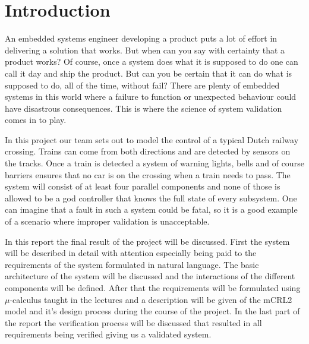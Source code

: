 \documentclass[final]{report}
\begin{document}
\chapter{Introduction}
An embedded systems engineer developing a product puts a lot of effort in delivering a solution that works.
But when can you say with certainty that a product works? Of course, once a system does what it is supposed to do one can call it day and ship the product.
But can you be certain that it can do what is supposed to do, all of the time, without fail? There are plenty of embedded systems in this world where a failure to function or unexpected behaviour could have disastrous consequences.
This is where the science of system validation comes in to play.

In this project our team sets out to model the control of a typical Dutch railway crossing.
Trains can come from both directions and are detected by sensors on the tracks.
Once a train is detected a system of warning lights, bells and of course barriers ensures that no car is on the crossing when a train needs to pass.
The system will consist of at least four parallel components and none of those is allowed to be a god controller that knows the full state of every subsystem.
One can imagine that a fault in such a system could be fatal, so it is a good example of a scenario where improper validation is unacceptable.

In this report the final result of the project will be discussed.
First the system will be described in detail with attention especially being paid to the requirements of the system formulated in natural language.
The basic architecture of the system will be discussed and the interactions of the different components will be defined.
After that the requirements will be formulated using $\mu$-calculus taught in the lectures and a description will be given of the mCRL2 model and it's design process during the course of the project.
In the last part of the report the verification process will be discussed that resulted in all requirements being verified giving us a validated system.
\end{document}
